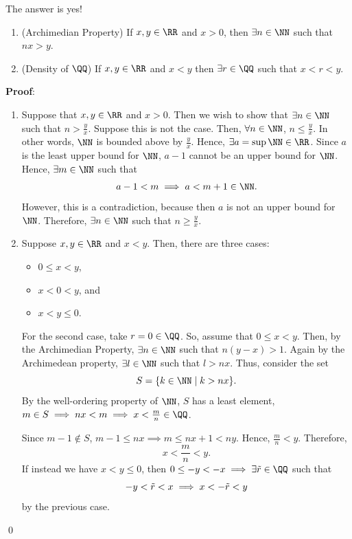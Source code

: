 \begin{theorem}
The answer is yes!
\begin{enumerate}[label = \roman*)]
    \item (Archimedian Property) If $x,y\in \RR$ and $x>0$, then $\exists n\in \NN$ such that $nx>y$.
    \item (Density of $\QQ$) If $x,y\in \RR$ and $x<y$ then $\exists r\in \QQ$ such that $x<r<y$.
\end{enumerate}
\end{theorem}
\textbf{Proof}: 
\begin{enumerate}[label = \roman*)]
    \item Suppose that $x,y\in \RR$ and $x>0$. Then we wish to show that $\exists n\in \NN$ such that $n>\frac{y}{x}$. Suppose this is not the case. Then, $\forall n\in \NN$, $n\leq \frac{y}{x}$. In other words, $\NN$ is bounded above by $\frac{y}{x}$. Hence, $\exists a = \sup \NN\in \RR$. Since $a$ is the least upper bound for $\NN$, $a-1$ cannot be an upper bound for $\NN$. Hence, $\exists m\in \NN$ such that 
    \[
        a-1<m \implies a<m+1\in \NN.
    \]
    However, this is a contradiction, because then $a$ is not an upper bound for $\NN$. Therefore, $\exists n \in \NN$ such that $n\geq \frac{y}{x}$.
    \item Suppose $x,y\in \RR$ and $x<y$. Then, there are three cases:
    \begin{itemize}
        \item $0\leq x<y$,
        \item $x<0<y$, and 
        \item $x<y\leq 0$.
    \end{itemize}
    For the second case, take $r=0\in \QQ$. So, assume that $0\leq x<y$. Then, by the Archimedian Property, $\exists n\in \NN$ such that $n(y-x)>1.$ Again by the Archimedean property, $\exists l\in \NN$ such that $l>nx$. Thus, consider the set
    \[
    S = \{k\in \NN \mid k>nx\}.
    \]
    By the well-ordering property of $\NN$, $S$ has a least element, $m\in S\implies nx<m \implies x<\frac{m}{n}\in \QQ$.
    
    Since $m-1\notin S$, $m-1\leq nx\implies m\leq nx+1<ny$. Hence, $\frac{m}{n}<y$. Therefore,
    \[
    x<\frac{m}{n}<y.
    \]
    If instead we have $x<y\leq 0$, then $0\leq -y <-x \implies \exists \Tilde{r}\in \QQ$ such that 
    \[
    -y<\Tilde{r}< x \implies x<-\Tilde{r}< y
    \]
    by the previous case. 
\end{enumerate}
\qed 

